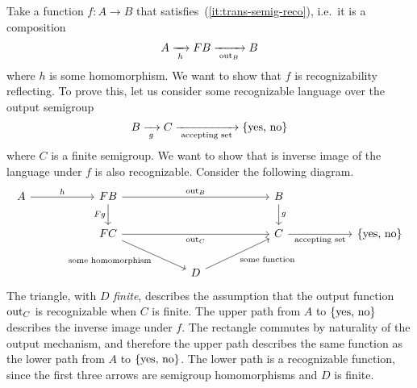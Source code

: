     
 Take a function $f : A \to B$ that satisfies~(\ref{it:trans-semig-reco}), i.e.~it is a composition 
\begin{align*}
    A \xrightarrow[\;h\;]{} \functor B \xrightarrow[\;\outfun_B\;]{} B
\end{align*}
where $h$ is some homomorphism.
We want to show that $f$ is recognizability reflecting. To prove this, let us consider some recognizable language over the output semigroup 
\begin{align*}
    B \xrightarrow[\;g\;]{} C \xrightarrow[\;\text{accepting set}\;]{} \{\text{yes, no}\}
\end{align*}
where $C$ is a finite semigroup.
We want to show that is inverse image of the language under $f$ is also recognizable. Consider the following diagram. 
\[\begin{tikzcd}
    [column sep=2cm]
	A & {\functor B} & & B \\
	& {\functor C} & & C & \set{\text{yes, no}}\\
    & & D
	\arrow["h", from=1-1, to=1-2]
	\arrow["\outfun_B", from=1-2, to=1-4]
	\arrow["{\functor g}"', from=1-2, to=2-2]
	\arrow["\outfun_C"', from=2-2, to=2-4]
	\arrow["g", from=1-4, to=2-4]
	\arrow["\text{accepting set}"', from=2-4, to=2-5]
    \arrow["\text{some homomorphism}"', from=2-2, to=3-3]
    \arrow["\text{some function}"', from=3-3, to=2-4]
\end{tikzcd}\]
The triangle, with $D$ \emph{finite}, describes  the assumption that the output function $\mathrm{out}_C$ is recognizable when $C$ is finite.
The upper path from $A$ to $\{\text{yes, no}\}$ describes the inverse image under $f$. 
 The  rectangle commutes by naturality of the output mechanism, and therefore the upper path describes the same function as the lower path from $A$ to $\{\text{yes, no}\}$. The lower path is a recognizable function, since the first three arrows are semigroup homomorphisms and $D$ is finite.
